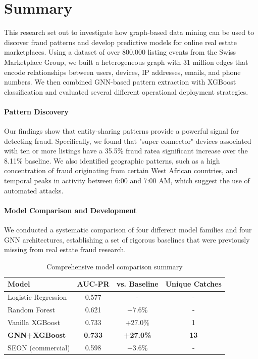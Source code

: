 \section{Summary}
\label{sec:6_1}

This research set out to investigate how graph-based data mining can be used to discover fraud patterns and develop predictive models for online real estate marketplaces. Using a dataset of over 800,000 listing events from the Swiss Marketplace Group, we built a heterogeneous graph with 31 million edges that encode relationships between users, devices, IP addresses, emails, and phone numbers. We then combined GNN-based pattern extraction with XGBoost classification and evaluated several different operational deployment strategies.

\paragraph{Pattern Discovery}
Our findings show that entity-sharing patterns provide a powerful signal for detecting fraud. Specifically, we found that "super-connector" devices associated with ten or more listings have a 35.5\% fraud ratea significant increase over the 8.11\% baseline. We also identified geographic patterns, such as a high concentration of fraud originating from certain West African countries, and temporal peaks in activity between 6:00 and 7:00 AM, which suggest the use of automated attacks.

\paragraph{Model Comparison and Development}
We conducted a systematic comparison of four different model families and four GNN architectures, establishing a set of rigorous baselines that were previously missing from real estate fraud research.

\begin{table}[h]
\centering
\caption{Comprehensive model comparison summary}
\label{tab:6_1_summary}
\begin{tabular}{lccc}
\toprule
\textbf{Model} & \textbf{AUC-PR} & \textbf{vs. Baseline} & \textbf{Unique Catches} \\
\midrule
Logistic Regression & 0.577 & - & - \\
Random Forest & 0.621 & +7.6\% & - \\
Vanilla XGBoost & 0.733 & +27.0\% & 1 \\
\textbf{GNN+XGBoost} & \textbf{0.733} & \textbf{+27.0\%} & \textbf{13} \\
SEON (commercial) & 0.598 & +3.6\% & - \\
\bottomrule
\end{tabular}
\end{table}

